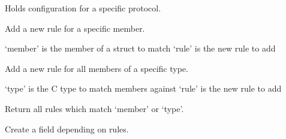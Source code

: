 \documentclass[A4paper,10pt,english]{sphinxmanual}
\begin{document}

\begin{fulllineitems}
\label{devel/code:config.Config}
Holds configuration for a specific protocol.

\begin{fulllineitems}
\label{devel/code:config.Config.add_member_rule}
Add a new rule for a specific member.

`member' is the member of a struct to match
`rule' is the new rule to add

\end{fulllineitems}


\begin{fulllineitems}
\label{devel/code:config.Config.add_type_rule}
Add a new rule for all members of a specific type.

`type' is the C type to match members against
`rule' is the new rule to add

\end{fulllineitems}


\begin{fulllineitems}
\label{devel/code:config.Config.get_rules}
Return all rules which match `member' or `type'.

\end{fulllineitems}


\begin{fulllineitems}
\label{devel/code:config.Config.create_field}
Create a field depending on rules.

\end{fulllineitems}


\end{fulllineitems}

\end{document}
